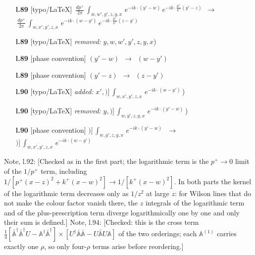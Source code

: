 \documentclass[10pt]{article}
\newenvironment{notebox}{\def\FrameCommand{{\color{notebar}\vrule width 1.5pt}\hspace{6pt}}\MakeFramed{\advance\hsize-\width\FrameRestore}\small}{\endMakeFramed}
\def\mf#1{\mathbb{#1}}
\begin{document}
\begin{itemize}[leftmargin=2.2em,itemsep=1pt,topsep=2pt]
\item[\textbf{l.89}] \textsf{\small [typo/LaTeX]} $\displaystyle \, \frac{dp^{+}}{2\pi}\,\int_{w,w',y',z,y,x}\, e^{-ik\cdot (y'-w)}\,e^{-ik\cdot \frac{p^{+}}{k^{+}}(y'-z)}$\ $\longrightarrow$\ $\displaystyle \, \frac{dp^{+}}{2\pi}\,\int_{w,x',y',z,x}\, e^{-ik\cdot (w-y')}\,e^{-ik\cdot \frac{p^{+}}{k^{+}}(z-y')}$
\item[\textbf{l.89}] \textsf{\small [typo/LaTeX]} \emph{removed:} $\displaystyle y,$$\displaystyle w,w',y',z,y,x${\color{gray}\small)}
\item[\textbf{l.89}] \textsf{\small [phase convention]} $\displaystyle (y'-w)$\ $\longrightarrow$\ $\displaystyle (w-y')$
\item[\textbf{l.89}] \textsf{\small [phase convention]} $\displaystyle (y'-z)$\ $\longrightarrow$\ $\displaystyle (z-y')$
\item[\textbf{l.90}] \textsf{\small [typo/LaTeX]} \emph{added:} $\displaystyle x',$$\displaystyle \Big)\Big]\,\int_{w,x',y',z,x}\, e^{-ik\cdot (w-y')}\,${\color{gray}\small)}
\item[\textbf{l.90}] \textsf{\small [typo/LaTeX]} \emph{removed:} $\displaystyle y,$$\displaystyle \Big)\Big]\,\int_{w,y',z,y,x}\, e^{-ik\cdot (y'-w)}\,${\color{gray}\small)}
\item[\textbf{l.90}] \textsf{\small [phase convention]} $\displaystyle )\Big]\,\int_{w,y',z,y,x}\, e^{-ik\cdot (y'-w)}\,$\ $\longrightarrow$\ $\displaystyle )\Big]\,\int_{w,x',y',z,x}\, e^{-ik\cdot (w-y')}\,$
\end{itemize}
\begin{notebox}\textsf{\small Note, l.92:} [Checked as in the first part; the logarithmic term is the $p^{+}\to 0$ limit of the $1/p^{+}$ term, including $1/[p^{+}(x-z)^{2}+k^{+}(x-w)^{2}]\to 1/[k^{+}(x-w)^{2}]$. In both parts the kernel of the logarithmic term decreases only as $1/z^{2}$ at large $z$: for Wilson lines that do not make the colour factor vanish there, the $z$ integrals of the logarithmic term and of the plus-prescription term diverge logarithmically one by one and only their sum is defined.]\end{notebox}
\begin{notebox}\textsf{\small Note, l.94:} [Checked: this is the cross term $\frac14[\bar{\mf{A}}^{\dagger}\bar{\mf{A}}^{\dagger}U-\mf{A}^{\dagger}\bar{\mf{A}}^{\dagger}]\times[U^{\dagger}\bar{\mf{A}}\bar{\mf{A}}-U\bar{\mf{A}}U\mf{A}]$ of the two orderings; each $\mf{A}^{(1)}$ carries exactly one $\rho$, so only four-$\rho$ terms arise before reordering.]\end{notebox}
\end{document}
